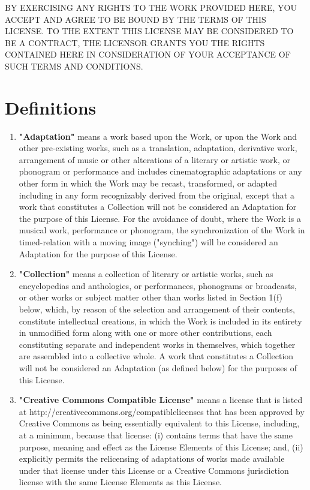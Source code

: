 \documentclass[10pt]{book}
\begin{document}
BY EXERCISING ANY RIGHTS TO THE WORK PROVIDED HERE, YOU         ACCEPT AND AGREE TO BE BOUND BY THE TERMS OF THIS LICENSE.         TO THE EXTENT THIS LICENSE MAY BE CONSIDERED TO BE A         CONTRACT, THE LICENSOR GRANTS YOU THE RIGHTS CONTAINED HERE         IN CONSIDERATION OF YOUR ACCEPTANCE OF SUCH TERMS AND         CONDITIONS.

\section{ Definitions}
\begin{enumerate}
	\item \textbf{"Adaptation"} means a work based upon           the Work, or upon the Work and other pre-existing works,           such as a translation, adaptation, derivative work,           arrangement of music or other alterations of a literary           or artistic work, or phonogram or performance and           includes cinematographic adaptations or any other form in           which the Work may be recast, transformed, or adapted           including in any form recognizably derived from the           original, except that a work that constitutes a           Collection will not be considered an Adaptation for the           purpose of this License. For the avoidance of doubt,           where the Work is a musical work, performance or           phonogram, the synchronization of the Work in           timed-relation with a moving image ("synching") will be           considered an Adaptation for the purpose of this           License.
	\item \textbf{"Collection"} means a collection of           literary or artistic works, such as encyclopedias and           anthologies, or performances, phonograms or broadcasts,           or other works or subject matter other than works listed           in Section 1(f) below, which, by reason of the selection           and arrangement of their contents, constitute           intellectual creations, in which the Work is included in           its entirety in unmodified form along with one or more           other contributions, each constituting separate and           independent works in themselves, which together are           assembled into a collective whole. A work that           constitutes a Collection will not be considered an           Adaptation (as defined below) for the purposes of this           License.
	\item \textbf{"Creative Commons Compatible           License"} means a license that is listed at           http://creativecommons.org/compatiblelicenses that has           been approved by Creative Commons as being essentially           equivalent to this License, including, at a minimum,           because that license: (i) contains terms that have the           same purpose, meaning and effect as the License Elements           of this License; and, (ii) explicitly permits the           relicensing of adaptations of works made available under           that license under this License or a Creative Commons           jurisdiction license with the same License Elements as           this License.

\end{enumerate}
\end{document}

